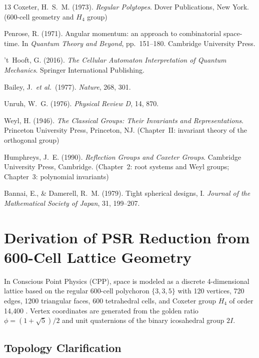 \documentclass[11pt,letterpaper]{article}
\begin{document}
\begin{thebibliography}{13}
Coxeter, H.~S.~M. (1973). 
\textit{Regular Polytopes}. 
Dover Publications, New York. 
(600-cell geometry and $H_4$ group)

Penrose, R. (1971). 
Angular momentum: an approach to combinatorial space-time. 
In \textit{Quantum Theory and Beyond}, pp.~151--180. 
Cambridge University Press.

't~Hooft, G. (2016). 
\textit{The Cellular Automaton Interpretation of Quantum Mechanics}. 
Springer International Publishing.

Bailey, J.\ \textit{et al.}\ (1977). 
\textit{Nature}, 268, 301.

Unruh, W.~G. (1976). 
\textit{Physical Review D}, 14, 870.

Weyl, H. (1946).
\textit{The Classical Groups: Their Invariants and Representations}.
Princeton University Press, Princeton, NJ.
(Chapter~II: invariant theory of the orthogonal group)

Humphreys, J.~E. (1990).
\textit{Reflection Groups and Coxeter Groups}.
Cambridge University Press, Cambridge.
(Chapter~2: root systems and Weyl groups; Chapter~3: polynomial 
invariants)

Bannai, E., \& Damerell, R.~M. (1979).
Tight spherical designs, I.
\textit{Journal of the Mathematical Society of Japan}, 31, 199--207.


\end{thebibliography}


\appendix

\section{Derivation of PSR Reduction from 600-Cell Lattice Geometry}

In Conscious Point Physics (CPP), space is modeled as a discrete 4-dimensional lattice based on the regular 600-cell polychoron $\{3,3,5\}$ with 120 vertices, 720 edges, 1200 triangular faces, 600 tetrahedral cells, and Coxeter group $H_4$ of order 14,400 \cite{coxeter1973}. Vertex coordinates are generated from the golden ratio $\phi = (1 + \sqrt{5})/2$ and unit quaternions of the binary icosahedral group $2I$.

\subsection{Topology Clarification}
\end{document}

